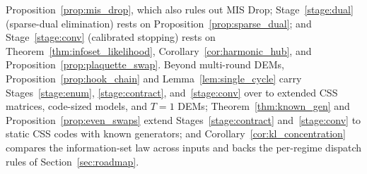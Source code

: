 \documentclass[12pt]{article}
\theoremstyle{definition}
\begin{document}
\begin{itemize}
    Proposition~\ref{prop:mis_drop}, which also rules out MIS Drop; Stage~\ref{stage:dual} (sparse-dual elimination)
    rests on Proposition~\ref{prop:sparse_dual}; and Stage~\ref{stage:conv} (calibrated stopping) rests on
    Theorem~\ref{thm:infoset_likelihood}, Corollary~\ref{cor:harmonic_hub}, and Proposition~\ref{prop:plaquette_swap}.
    Beyond multi-round DEMs, Proposition~\ref{prop:hook_chain} and Lemma~\ref{lem:single_cycle} carry
    Stages~\ref{stage:enum}, \ref{stage:contract}, and~\ref{stage:conv} over to extended CSS matrices, code-sized
    models, and $T = 1$ DEMs; Theorem~\ref{thm:known_gen} and Proposition~\ref{prop:even_swaps} extend
    Stages~\ref{stage:contract} and~\ref{stage:conv} to static CSS codes with known generators; and
    Corollary~\ref{cor:kl_concentration} compares the information-set law across inputs and backs the per-regime
    dispatch rules of Section~\ref{sec:roadmap}.
\end{itemize}
\end{document}
